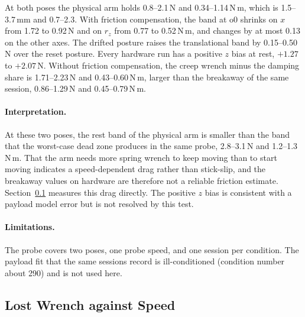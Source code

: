 At both poses the physical arm holds 0.8--2.1\,N and 0.34--1.14\,N\,m, which is 1.5--3.7\,mm and 0.7--2.3\degree. With friction compensation, the band at o0 shrinks on $x$ from 1.72 to 0.92\,N and on $r_z$ from 0.77 to 0.52\,N\,m, and changes by at most 0.13 on the other axes. The drifted posture raises the translational band by 0.15--0.50\,N over the reset posture. Every hardware run has a positive $z$ bias at rest, $+1.27$ to $+2.07$\,N. Without friction compensation, the creep wrench minus the damping share is 1.71--2.23\,N and 0.43--0.60\,N\,m, larger than the breakaway of the same session, 0.86--1.29\,N and 0.45--0.79\,N\,m.

\paragraph{Interpretation.} At these two poses, the rest band of the physical arm is smaller than the band that the worst-case dead zone produces in the same probe, 2.8--3.1\,N and 1.2--1.3\,N\,m. That the arm needs more spring wrench to keep moving than to start moving indicates a speed-dependent drag rather than stick-slip, and the breakaway values on hardware are therefore not a reliable friction estimate. Section~\ref{sec:app-ctrl-sweep} measures this drag directly. The positive $z$ bias is consistent with a payload model error but is not resolved by this test.

\paragraph{Limitations.} The probe covers two poses, one probe speed, and one session per condition. The payload fit that the same sessions record is ill-conditioned (condition number about 290) and is not used here.

\subsection{Lost Wrench against Speed}\label{sec:app-ctrl-sweep}

